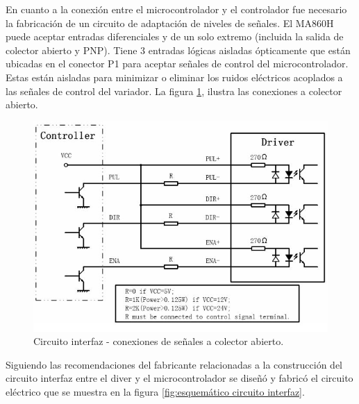 En cuanto a la conexión entre el microcontrolador y el controlador fue necesario la fabricación de un circuito de adaptación de niveles de señales. El MA860H puede aceptar entradas diferenciales y de un solo extremo (incluida la salida de colector abierto y PNP). Tiene 3 entradas lógicas aisladas ópticamente que están ubicadas en el conector P1 para aceptar señales de control del microcontrolador. Estas están aisladas para minimizar o eliminar los ruidos eléctricos acoplados a las señales de control del variador. La figura \ref{fig:circuito interfaz}, ilustra las conexiones a colector abierto.

\begin{figure}[htpb]
\centering
\includegraphics[scale=.65]{./Figures/circuitointerfaz-driver.jpeg}
\caption{Circuito interfaz - conexiones de señales a colector abierto.}
\label{fig:circuito interfaz}
\end{figure}

Siguiendo las recomendaciones del fabricante relacionadas a la construcción del circuito interfaz entre el diver y el microcontrolador se diseñó y fabricó el circuito eléctrico que se muestra en la figura \ref{fig:esquemático circuito interfaz}.

